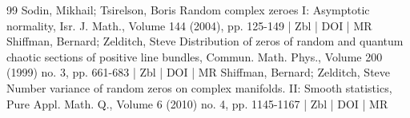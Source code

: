 \begin{thebibliography}{99}
Sodin, Mikhail; Tsirelson, Boris Random complex zeroes I: Asymptotic normality, Isr. J. Math., Volume 144 (2004), pp. 125-149 | Zbl | DOI | MR
Shiffman, Bernard; Zelditch, Steve Distribution of zeros of random and quantum chaotic sections of positive line bundles, Commun. Math. Phys., Volume 200 (1999) no. 3, pp. 661-683 | Zbl | DOI | MR
Shiffman, Bernard; Zelditch, Steve Number variance of random zeros on complex manifolds. II: Smooth statistics, Pure Appl. Math. Q., Volume 6 (2010) no. 4, pp. 1145-1167 | Zbl | DOI | MR
\end{thebibliography}
